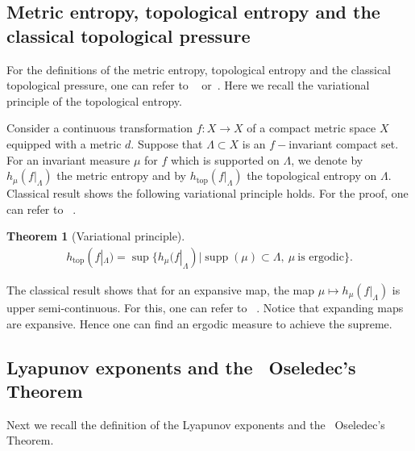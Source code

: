 \documentclass[11pt,a4paper]{amsart}
\theoremstyle{plain}
\newtheorem{Thm}{Theorem}[section]
\theoremstyle{remark}
\def\supp{\operatorname{supp}}
\begin{document}
	\subsection{Metric entropy, topological entropy and the classical topological pressure}
	For the definitions of the metric entropy, topological entropy and the classical topological pressure, one can refer to ~\cite{Pesin} or~\cite{WALTERS}. Here we recall the variational principle of the topological entropy.
	
	Consider a continuous transformation $f: X\to X$ of a compact metric space $X$ equipped with a metric $d$. Suppose that $\Lambda\subset X$ is an $f-$invariant compact set. For an invariant measure $\mu$ for $f$ which is supported on $\Lambda$, we denote by $h_{\mu}(f|_{\Lambda})$ the metric entropy and by $h_{\text{top}}(f|_{\Lambda})$ the topological entropy on $\Lambda$. Classical result shows the following variational principle holds. For the proof, one can refer to ~\cite{WALTERS}.
	\begin{Thm}[Variational principle]
		\begin{align*}
			h_{\text{top}}(f|_{\Lambda})=\sup\{h_{\mu}(f|_{\Lambda})|\supp(\mu)\subset\Lambda,~\mu~\text{is~ergodic}\}.
		\end{align*}
	\end{Thm}
	The classical result shows that for an expansive map, the map $\mu\mapsto h_{\mu}(f|_{\Lambda})$ is upper semi-continuous. For this, one can refer to ~\cite{WALTERS}. Notice that expanding maps  are expansive. Hence one can find an ergodic measure to achieve the supreme.
	\iffalse
	\subsection{Lyapunov exponents and the ~Oseledec's Theorem}
	Next we recall the definition of the Lyapunov exponents and the ~Oseledec's Theorem.
	
\end{document}
